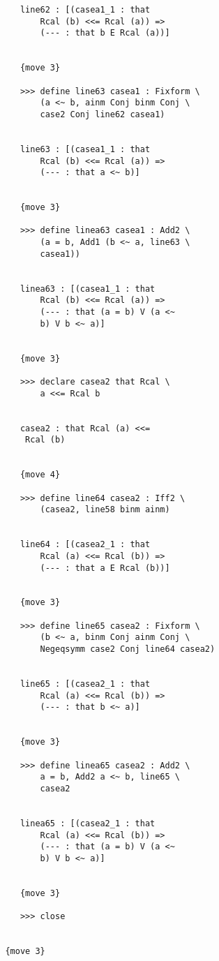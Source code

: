 \documentclass[12pt]{article}
\begin{document}
\begin{verbatim}
            line62 : [(casea1_1 : that 
                Rcal (b) <<= Rcal (a)) => 
                (--- : that b E Rcal (a))]


            {move 3}

            >>> define line63 casea1 : Fixform \
                (a <~ b, ainm Conj binm Conj \
                case2 Conj line62 casea1)


            line63 : [(casea1_1 : that 
                Rcal (b) <<= Rcal (a)) => 
                (--- : that a <~ b)]


            {move 3}

            >>> define linea63 casea1 : Add2 \
                (a = b, Add1 (b <~ a, line63 \
                casea1))


            linea63 : [(casea1_1 : that 
                Rcal (b) <<= Rcal (a)) => 
                (--- : that (a = b) V (a <~ 
                b) V b <~ a)]


            {move 3}

            >>> declare casea2 that Rcal \
                a <<= Rcal b


            casea2 : that Rcal (a) <<= 
             Rcal (b)


            {move 4}

            >>> define line64 casea2 : Iff2 \
                (casea2, line58 binm ainm)


            line64 : [(casea2_1 : that 
                Rcal (a) <<= Rcal (b)) => 
                (--- : that a E Rcal (b))]


            {move 3}

            >>> define line65 casea2 : Fixform \
                (b <~ a, binm Conj ainm Conj \
                Negeqsymm case2 Conj line64 casea2)


            line65 : [(casea2_1 : that 
                Rcal (a) <<= Rcal (b)) => 
                (--- : that b <~ a)]


            {move 3}

            >>> define linea65 casea2 : Add2 \
                a = b, Add2 a <~ b, line65 \
                casea2


            linea65 : [(casea2_1 : that 
                Rcal (a) <<= Rcal (b)) => 
                (--- : that (a = b) V (a <~ 
                b) V b <~ a)]


            {move 3}

            >>> close


         {move 3}


\end{verbatim}
\end{document}
